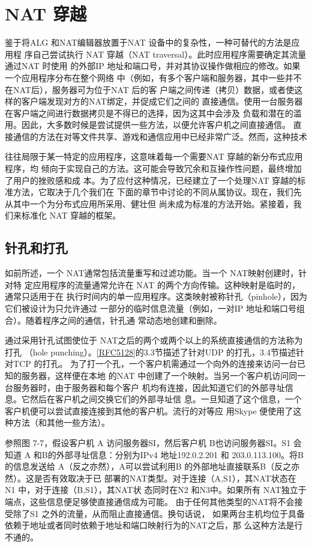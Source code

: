 \section{NAT 穿越}

鉴于将ALG 和NAT编辑器放置于NAT 设备中的复杂性，一种可替代的方法是应用程
序自己尝试执行 NAT 穿越（NAT traversal）。此时应用程序需要确定其流量通过NAT 时使用
的外部IP 地址和端口号，并对其协议操作做相应的修改。如果一个应用程序分布在整个网络
中（例如，有多个客户端和服务器，其中一些并不在NAT后），服务器可为位于NAT 后的客
户端之间传递（拷贝）数据，或者使这样的客户端发现对方的NAT绑定，并促成它们之间的
直接通信。使用一台服务器在客户端之间进行数据拷贝是不得已的选择，因为这其中会涉及
负载和潜在的滥用。因此，大多数时候是尝试提供一些方法，以便允许客户机之间直接通信。
直接通信的方法在对等文件共享、游戏和通信应用中已经非常广泛。然而，这种技术

往往局限于某一特定的应用程序，这意味着每一个需要NAT 穿越的新分布式应用程序，均
倾向于实现自己的方法。这可能会导致冗余和互操作性问题，最终增加了用户的挫败感和成
本。为了应付这种情况，已经建立了一个处理NAT 穿越的标准方法，它取决于几个我们在
下面的章节中讨论的不同从属协议。现在，我们先从其中一个为分布式应用所采用、健壮但
尚未成为标准的方法开始。紧接着，我们来标准化 NAT 穿越的框架。

\subsection{针孔和打孔}

如前所述，一个 NAT通常包括流量重写和过滤功能。当一个 NAT映射创建时，针对特
定应用程序的流量通常允许在 NAT 的两个方向传输。这种映射是临时的，通常只适用于在
执行时间内的单一应用程序。这类映射被称针孔（pinhole），因为它们被设计为只允许通过
一部分的临时信息流量（例如，一对IP 地址和端口号组合）。随着程序之间的通信，针孔通
常动态地创建和删除。

通过采用针孔试图使位于 NAT之后的两个或两个以上的系统直接通信的方法称为打孔
（hole
punching）。\href{https://www.rfc-editor.org/rfc/rfc5128}{[RFC5128]}的3.3节描述了针对UDP
的打孔，3.4节描述针对TCP 的打孔。
为了打一个孔，一个客户机需通过一个向外的连接来访问一台已知的服务器，这样便在本地
的NAT 中创建了一个映射。当另一个客户机访问同一台服务器时，由于服务器和每个客户
机均有连接，因此知道它们的外部寻址信息。它然后在客户机之间交换它们的外部寻址信
息。一旦知道了这个信息，一个客户机便可以尝试直接连接到其他的客户机。流行的对等应
用Skype 便使用了这种方法（和其他一些方法）。

参照图 7-7，假设客户机 A 访问服务器SI，然后客户机 B也访问服务器SI。S1 会知道
A 和B的外部寻址信息：分别为IPv4 地址192.0.2.201 和 203.0.113.100。将B 的信息发送给
A（反之亦然），A可以尝试利用B 的外部地址直接联系B（反之亦然）。这是否有效取决于已
部署的NAT类型。对于连接（A,S1），其NAT状态在 N1 中，对于连接（B,S1），其NAT状
态同时在N2 和N3中。如果所有 NAT独立于端点，这些信息便足够使直接通信成为可能。
由于任何其他类型的NAT将不会接受除了S1 之外的流量，从而阻止直接通信。换句话说，
如果两台主机均位于具备依赖于地址或者同时依赖于地址和端口映射行为的NAT之后，那
么这种方法是行不通的。

